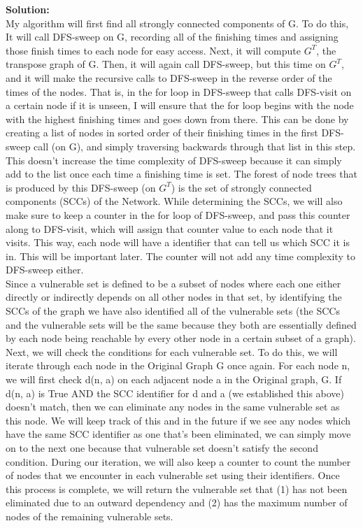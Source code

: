 \documentclass[10pt]{article}
\newcommand{\solution}[1]{\color{blue}\hfill\break\noindent\textbf{Solution:} #1\color{black}}
\begin{document}
\solution{ \\
\null \quad My algorithm will first find all strongly connected components of G. To do this, It will call DFS-sweep on G, recording all of the finishing times and assigning those finish times to each node for easy access. Next, it will compute $G^T$, the transpose graph of G. Then, it will again call DFS-sweep, but this time on $G^T$, and it will make the recursive calls to DFS-sweep in the reverse order of the times of the nodes. That is, in the for loop in DFS-sweep that calls DFS-visit on a certain node if it is unseen, I will ensure that the for loop begins with the node with the highest finishing times and goes down from there. This can be done by creating a list of nodes in sorted order of their finishing times in the first DFS-sweep call (on G), and simply traversing backwards through that list in this step. This doesn't increase the time complexity of DFS-sweep because it can simply add to the list once each time a finishing time is set. The forest of node trees that is produced by this DFS-sweep (on $G^T$) is the set of strongly connected components (SCCs) of the Network. While determining the SCCs, we will also make sure to keep a counter in the for loop of DFS-sweep, and pass this counter along to DFS-visit, which will assign that counter value to each node that it visits. This way, each node will have a identifier that can tell us which SCC it is in. This will be important later. The counter will not add any time complexity to DFS-sweep either. \\ 
Since a vulnerable set is defined to be a subset of nodes where each one either directly or indirectly depends on all other nodes in that set, by identifying the SCCs of the graph we have also identified all of the vulnerable sets (the SCCs and the vulnerable sets will be the same because they both are essentially defined by each node being reachable by every other node in a certain subset of a graph). \\
Next, we will check the conditions for each vulnerable set. To do this, we will iterate through each node in the Original Graph G once again. For each node n, we will first check d(n, a) on each adjacent node a in the Original graph, G. If d(n, a) is True AND the SCC identifier for d and a (we established this above) doesn't match, then we can eliminate any nodes in the same vulnerable set as this node. We will keep track of this and in the future if we see any nodes which have the same SCC identifier as one that's been eliminated, we can simply move on to the next one because that vulnerable set doesn't satisfy the second condition. During our iteration, we will also keep a counter to count the number of nodes that we encounter in each vulnerable set using their identifiers. Once this process is complete, we will return the vulnerable set that (1) has not been eliminated due to an outward dependency and (2) has the maximum number of nodes of the remaining vulnerable sets. \\ \\
}
\end{document}
